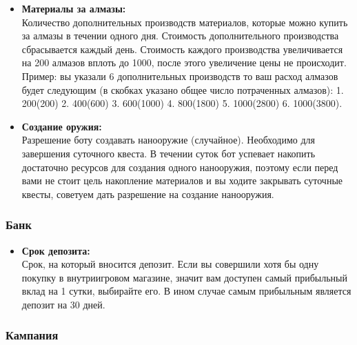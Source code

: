 \documentclass[
]{article}
\providecommand{\tightlist}{%
  \setlength{\itemsep}{0pt}\setlength{\parskip}{0pt}}
\begin{document}
\begin{itemize}
\item
  \textbf{Материалы за алмазы:}\\
  Количество дополнительных производств материалов, которые можно купить
  за алмазы в течении одного дня. Стоимость дополнительного производства
  сбрасывается каждый день. Стоимость каждого производства увеличивается
  на 200 алмазов вплоть до 1000, после этого увеличение цены не
  происходит. Пример: вы указали 6 дополнительных производств то ваш
  расход алмазов будет следующим (в скобках указано общее число
  потраченных алмазов): 1. 200(200) 2. 400(600) 3. 600(1000) 4.
  800(1800) 5. 1000(2800) 6. 1000(3800).
\item
  \textbf{Создание оружия:}\\
  Разрешение боту создавать нанооружие (случайное). Необходимо для
  завершения суточного квеста. В течении суток бот успевает накопить
  достаточно ресурсов для создания одного нанооружия, поэтому если перед
  вами не стоит цель накопление материалов и вы ходите закрывать
  суточные квесты, советуем дать разрешение на создание нанооружия.
\end{itemize}

\subsubsection{Банк}\label{ux431ux430ux43dux43a-1}

\begin{itemize}
\tightlist
\item
  \textbf{Срок депозита:}\\
  Срок, на который вносится депозит. Если вы совершили хотя бы одну
  покупку в внутриигровом магазине, значит вам доступен самый прибыльный
  вклад на 1 сутки, выбирайте его. В ином случае самым прибыльным
  является депозит на 30 дней.
\end{itemize}

\subsubsection{Кампания}\label{ux43aux430ux43cux43fux430ux43dux438ux44f-1}
\end{document}
